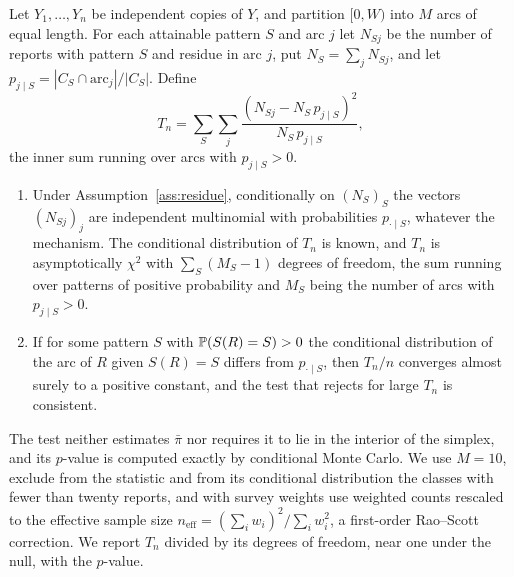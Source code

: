 \begin{theorem}\label{thm:spec}
Let $Y_1,\dots,Y_n$ be independent copies of $Y$, and partition $[0,W)$ into $M$ arcs of equal length. For each attainable pattern $S$ and arc $j$ let $N_{Sj}$ be the number of reports with pattern $S$ and residue in arc $j$, put $N_S=\sum_jN_{Sj}$, and let $p_{j\mid S}=|C_S\cap\mathrm{arc}_j|/|C_S|$. Define
\[
T_n=\sum_S\sum_{j}\frac{(N_{Sj}-N_S\,p_{j\mid S})^2}{N_S\,p_{j\mid S}},
\]
the inner sum running over arcs with $p_{j\mid S}>0$.
\begin{enumerate}
\item[(a)] Under Assumption~\ref{ass:residue}, conditionally on $(N_S)_S$ the vectors $(N_{Sj})_j$ are independent multinomial with probabilities $p_{\cdot\mid S}$, whatever the mechanism. The conditional distribution of $T_n$ is known, and $T_n$ is asymptotically $\chi^2$ with $\sum_S(M_S-1)$ degrees of freedom, the sum running over patterns of positive probability and $M_S$ being the number of arcs with $p_{j\mid S}>0$.
\item[(b)] If for some pattern $S$ with $\mathbb{P}(S(R)=S)>0$ the conditional distribution of the arc of $R$ given $S(R)=S$ differs from $p_{\cdot\mid S}$, then $T_n/n$ converges almost surely to a positive constant, and the test that rejects for large $T_n$ is consistent.
\end{enumerate}
\end{theorem}

The test neither estimates $\bar\pi$ nor requires it to lie in the interior of the simplex, and its $p$-value is computed exactly by conditional Monte Carlo. We use $M=10$, exclude from the statistic and from its conditional distribution the classes with fewer than twenty reports, and with survey weights use weighted counts rescaled to the effective sample size $n_{\mathrm{eff}}=(\sum_iw_i)^2/\sum_iw_i^2$, a first-order Rao--Scott correction. We report $T_n$ divided by its degrees of freedom, near one under the null, with the $p$-value.

